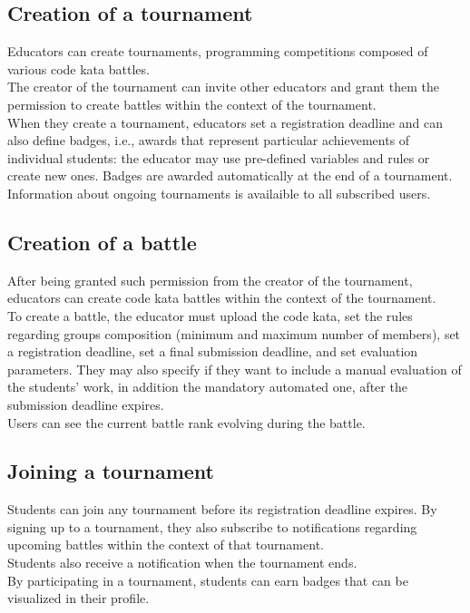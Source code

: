 \subsection{Creation of a tournament}
Educators can create tournaments, programming competitions composed of various code kata battles.\\
The creator of the tournament can invite other educators and grant them the permission to create battles within the 
context of the tournament.\\
When they create a tournament, educators set a registration deadline and can also define badges, i.e., awards that 
represent particular achievements of individual students: the educator may use pre-defined variables and rules or create 
new ones. Badges are awarded automatically at the end of a tournament.\\
Information about ongoing tournaments is availaible to all subscribed users.\\

\subsection{Creation of a battle}
After being granted such permission from the creator of the tournament, educators can create code kata battles within the
context of the tournament.\\
To create a battle, the educator must upload the code kata, set the rules regarding groups composition (minimum and maximum 
number of members), set a registration deadline, set a final submission deadline, and set evaluation parameters. They may also 
specify if they want to include a manual evaluation of the students' work, in addition the mandatory automated one, after the 
submission deadline expires.\\
Users can see the current battle rank evolving during the battle.\\

\subsection{Joining a tournament}
Students can join any tournament before its registration deadline expires. By signing up to a tournament, they also 
subscribe to notifications regarding upcoming battles within the context of that tournament.\\
Students also receive a notification when the tournament ends.\\
By participating in a tournament, students can earn badges that can be visualized in their profile.\\

